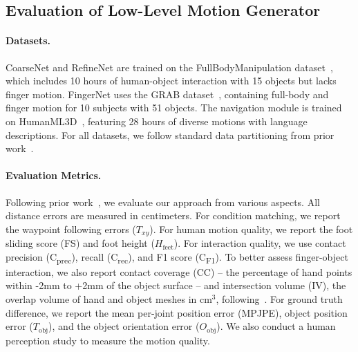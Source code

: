 \subsection{Evaluation of Low-Level Motion Generator}
\label{subsec:low_level_eval}


\paragraph{Datasets.}
CoarseNet and RefineNet are trained on the FullBodyManipulation dataset~\cite{li2023object}, which includes 10 hours of human-object interaction with 15 objects but lacks finger motion.
FingerNet uses the GRAB dataset~\cite{GRAB:2020}, containing full-body and finger motion for 10 subjects with 51 objects.
The navigation module is trained on HumanML3D~\cite{guo2022generating}, featuring 28 hours of diverse motions with language descriptions.
For all datasets, we follow standard data partitioning from prior work~\cite{li2023object, GRAB:2020, guo2022generating}.

\vspace{-4mm}
\paragraph{Evaluation Metrics.}
Following prior work~\cite{li2023controllable}, we evaluate our approach from various aspects.
All distance errors are measured in centimeters. 
For condition matching, we report the waypoint following errors ($T_{xy}$).
For human motion quality, we report the foot sliding score (FS) and foot height ($H_{\text{feet}}$).
For interaction quality, we use contact precision (C\textsubscript{prec}), recall (C\textsubscript{rec}), and F1 score (C\textsubscript{F1}).
To better assess finger-object interaction, we also report contact coverage (CC) -- the percentage of hand points within -2mm to +2mm of the object surface -- and intersection volume (IV), the overlap volume of hand and object meshes in $\text{cm}^3$, following~\cite{grady2021contactopt}.
For ground truth difference, we report the mean per-joint position error (MPJPE), object position error ($T_{\text{obj}}$), and the object orientation error ($O_{\text{obj}}$).
We also conduct a human perception study to measure the motion quality.

